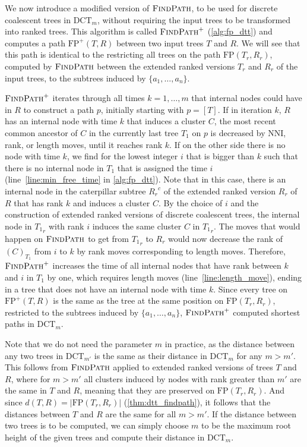 \documentclass[11pt]{amsart}
\newcommand{\findpath}{\textsc{FindPath}}
\newcommand{\nni}{\mathrm{NNI}}
\newcommand{\fp}{\mathrm{FP}}
\newcommand{\dct}{\mathrm{DCT}}
\providecommand{\DIFaddtex}[1]{{\protect\color{blue}\uwave{#1}}} %
\providecommand{\DIFdeltex}[1]{{\protect\color{red}\sout{#1}}}                      %
\providecommand{\DIFaddbegin}{} %
\providecommand{\DIFaddend}{} %
\providecommand{\DIFdelbegin}{} %
\providecommand{\DIFdelend}{} %
\providecommand{\DIFadd}[1]{\texorpdfstring{\DIFaddtex{#1}}{#1}} %
\providecommand{\DIFdel}[1]{\texorpdfstring{\DIFdeltex{#1}}{}} %
\newcommand{\DIFscaledelfig}{0.5}
\newlength{\DIFdelgraphicswidth} %
\newlength{\DIFdelgraphicsheight} %
\newcommand{\DIFaddincludegraphics}[2][]{{\color{blue}\fbox{\DIFOincludegraphics[#1]{#2}}}} %
\newcommand{\DIFdelincludegraphics}[2][]{%
\sbox{\DIFdelgraphicsbox}{\DIFOincludegraphics[#1]{#2}}%
\settoboxwidth{\DIFdelgraphicswidth}{\DIFdelgraphicsbox} %
\settoboxtotalheight{\DIFdelgraphicsheight}{\DIFdelgraphicsbox} %
\scalebox{\DIFscaledelfig}{%
\parbox[b]{\DIFdelgraphicswidth}{\usebox{\DIFdelgraphicsbox}\\[-\baselineskip] \rule{\DIFdelgraphicswidth}{0em}}\llap{\resizebox{\DIFdelgraphicswidth}{\DIFdelgraphicsheight}{%
\setlength{\unitlength}{\DIFdelgraphicswidth}%
\begin{picture}(1,1)%
\thicklines\linethickness{2pt} %
{\color[rgb]{1,0,0}\put(0,0){\framebox(1,1){}}}%
{\color[rgb]{1,0,0}\put(0,0){\line( 1,1){1}}}%
{\color[rgb]{1,0,0}\put(0,1){\line(1,-1){1}}}%
\end{picture}%
}\hspace*{3pt}}} %
} %
\DeclareRobustCommand{\DIFaddbegin}{\DIFOaddbegin \let\includegraphics\DIFaddincludegraphics} %
\DeclareRobustCommand{\DIFaddend}{\DIFOaddend \let\includegraphics\DIFOincludegraphics} %
\DeclareRobustCommand{\DIFdelbegin}{\DIFOdelbegin \let\includegraphics\DIFdelincludegraphics} %
\DeclareRobustCommand{\DIFdelend}{\DIFOaddend \let\includegraphics\DIFOincludegraphics} %
\begin{document}
We now introduce a modified version of $\findpath$, to be used for discrete coalescent trees in $\dct_m$, without requiring the input trees to be transformed into ranked trees.
This algorithm is called $\findpath^+$ (\autoref{alg:fp_dtt}) and computes a path $\fp^+(T,R)$ between two input trees $T$ and $R$.
We will see that this path is identical to the \DIFaddbegin \DIFadd{path resulting from }\DIFaddend restricting all trees on the path $\fp(T_r,R_r)$, computed by $\findpath$ between the extended ranked versions $T_r$ and $R_r$ of the input trees, to the subtrees induced by $\{a_1, \ldots, a_n\}$.

$\findpath^+$ iterates through all times $k = 1, \ldots, m$ that internal nodes could have in $R$ to construct a path $p$, initially starting with $p = [T]$.
If in iteration $k$, $R$ has an internal node with time $k$ that induces a cluster $C$, the most recent common ancestor of $C$ in the currently last tree $T_1$ on $p$ is decreased by $\nni$, rank, or length moves, until it reaches rank $k$.
If on the other side there is no node with time $k$, we find for the lowest integer $i$ that is bigger than $k$ such that there is no internal node in $T_1$ that is assigned the time $i$ (line~\ref{line:min_free_time} in \autoref{alg:fp_dtt}).
Note that in this case, there is an internal node in the caterpillar subtree ${R_r}^c$ of the extended ranked version $R_r$ of $R$ that has rank $k$ and induces a cluster $C$.
By the choice of $i$ and the construction of extended ranked versions of discrete coalescent trees, the internal node in ${T_1}_r$ with rank $i$ induces the same cluster $C$ in ${T_1}_r$.
The moves that would happen on $\findpath$ to get from ${T_1}_r$ to $R_r$ would now decrease the rank of $(C)_{T_1}$ from $i$ to $k$ by rank moves corresponding to length moves.
Therefore, $\findpath^+$ increases the time of all internal nodes that have rank between $k$ and $i$ in $T_1$ by one, which requires length moves (line~\ref{line:length_move}), ending in a tree that does not have an internal node with time $k$.
Since every tree on $\fp^+(T,R)$ is the same as the tree at the same position on $\fp(T_r,R_r)$, restricted to the subtrees induced by $\{a_1, \ldots, a_n\}$, $\findpath^+$ computed shortest paths in $\dct_m$.

Note that we do not need the parameter $m$ in practice, as the distance between any two trees in $\dct_{m'}$ is the same as their distance in $\dct_m$ for any $m > m'$.
This follows from $\findpath$ applied to extended ranked versions of trees $T$ and $R$, where for $m>m'$ all clusters induced by nodes with rank greater than $m'$ are the same in $T$ and $R$, meaning that they are preserved on $\fp(T_r,R_r)$.
And since \DIFdelbegin \DIFdel{$d(T,R) = |\fp(T_r,R_r)|$ }\DIFdelend \DIFaddbegin \DIFadd{$d_{\dct}(T,R) = |\fp(T_r,R_r)|$ }\DIFaddend (\autoref{thm:dtt_findpath}), it follows that the distances between $T$ and $R$ are the same for all $m > m'$.
If the distance between two trees is to be computed, we can simply choose $m$ to be the maximum root height of the given trees and compute their distance in $\dct_m$.
\end{document}
